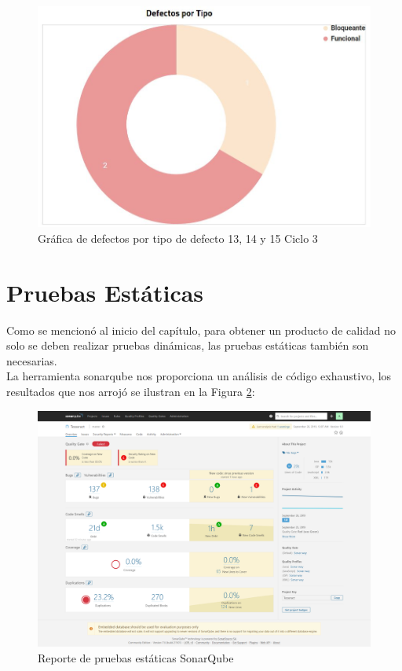 \begin{figure}[H]
	\begin{center}
		\includegraphics[width=.75\textwidth]{images/pruebas/s13c3-2}
		\caption{Gráfica de defectos por tipo de defecto 13, 14 y 15  Ciclo 3}
		\label{fig:infos13c3-2}
	\end{center}
\end{figure}
\newpage

\section{Pruebas Estáticas}
Como se mencionó al inicio del capítulo, para obtener un producto de calidad no solo se deben realizar pruebas dinámicas, las pruebas estáticas también son necesarias.\\ La herramienta sonarqube nos proporciona un análisis de código exhaustivo, los resultados que nos arrojó se ilustran en la Figura \ref{fig:infoesta}: \\

\begin{figure}[H]
	\begin{center}
		\includegraphics[width=.99\textwidth]{images/pruebas/estaticas/TesseractSonarFirstQualityTest}
		\caption{Reporte de pruebas estáticas SonarQube}
		\label{fig:infoesta}
	\end{center}
\end{figure}
